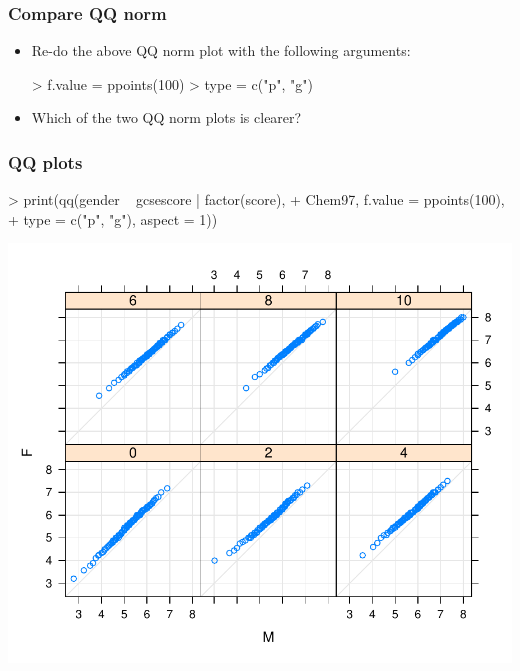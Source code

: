 \begin{frame}
  \frametitle{Compare QQ norm}
  \begin{itemize}
  \item Re-do the above QQ norm plot with the following arguments:
\begin{Schunk}
\begin{Sinput}
> f.value = ppoints(100)
> type = c("p", "g")
\end{Sinput}
\end{Schunk}
  \item Which of the two QQ norm plots is clearer?
  \end{itemize}
\end{frame}

\begin{frame}
  \frametitle{QQ plots}
\begin{Schunk}
\begin{Sinput}
> print(qq(gender ~ gcsescore | factor(score), 
+     Chem97, f.value = ppoints(100), 
+     type = c("p", "g"), aspect = 1))
\end{Sinput}
\end{Schunk}
\includegraphics{plots/fig-015}
\end{frame}

